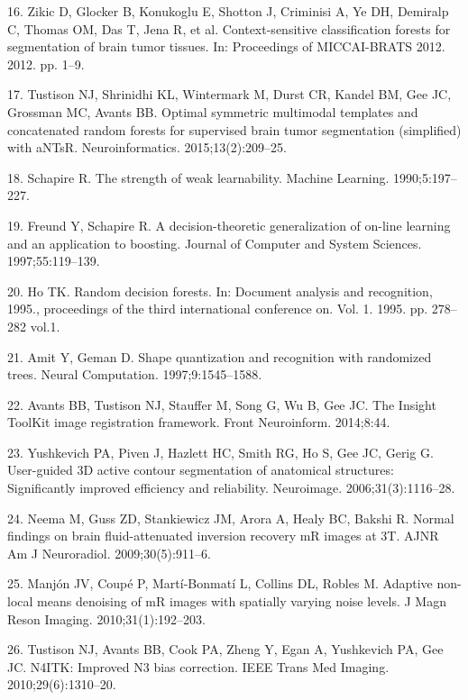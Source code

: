 \documentclass[11pt,]{article}
\begin{document}
\hypertarget{ref-zikic2012}{}
16. Zikic D, Glocker B, Konukoglu E, Shotton J, Criminisi A, Ye DH,
Demiralp C, Thomas OM, Das T, Jena R, et al. Context-sensitive
classification forests for segmentation of brain tumor tissues. In:
Proceedings of MICCAI-BRATS 2012. 2012. pp. 1--9.

\hypertarget{ref-Tustison:2015aa}{}
17. Tustison NJ, Shrinidhi KL, Wintermark M, Durst CR, Kandel BM, Gee
JC, Grossman MC, Avants BB. Optimal symmetric multimodal templates and
concatenated random forests for supervised brain tumor segmentation
(simplified) with aNTsR. Neuroinformatics. 2015;13(2):209--25.

\hypertarget{ref-schapire1990}{}
18. Schapire R. The strength of weak learnability. Machine Learning.
1990;5:197--227.

\hypertarget{ref-freund1997}{}
19. Freund Y, Schapire R. A decision-theoretic generalization of on-line
learning and an application to boosting. Journal of Computer and System
Sciences. 1997;55:119--139.

\hypertarget{ref-ho1995}{}
20. Ho TK. Random decision forests. In: Document analysis and
recognition, 1995., proceedings of the third international conference
on. Vol. 1. 1995. pp. 278--282 vol.1.

\hypertarget{ref-amit1997}{}
21. Amit Y, Geman D. Shape quantization and recognition with randomized
trees. Neural Computation. 1997;9:1545--1588.

\hypertarget{ref-Avants:2014aa}{}
22. Avants BB, Tustison NJ, Stauffer M, Song G, Wu B, Gee JC. The
Insight ToolKit image registration framework. Front Neuroinform.
2014;8:44.

\hypertarget{ref-Yushkevich:2006aa}{}
23. Yushkevich PA, Piven J, Hazlett HC, Smith RG, Ho S, Gee JC, Gerig G.
User-guided 3D active contour segmentation of anatomical structures:
Significantly improved efficiency and reliability. Neuroimage.
2006;31(3):1116--28.

\hypertarget{ref-Neema:2009aa}{}
24. Neema M, Guss ZD, Stankiewicz JM, Arora A, Healy BC, Bakshi R.
Normal findings on brain fluid-attenuated inversion recovery mR images
at 3T. AJNR Am J Neuroradiol. 2009;30(5):911--6.

\hypertarget{ref-Manjon:2010aa}{}
25. Manjón JV, Coupé P, Martí-Bonmatí L, Collins DL, Robles M. Adaptive
non-local means denoising of mR images with spatially varying noise
levels. J Magn Reson Imaging. 2010;31(1):192--203.

\hypertarget{ref-Tustison:2010ac}{}
26. Tustison NJ, Avants BB, Cook PA, Zheng Y, Egan A, Yushkevich PA, Gee
JC. N4ITK: Improved N3 bias correction. IEEE Trans Med Imaging.
2010;29(6):1310--20.
\end{document}
